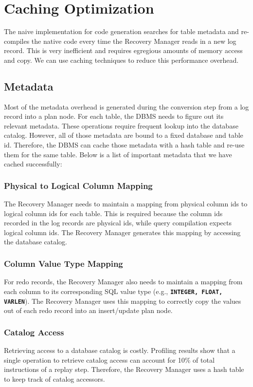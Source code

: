 \documentclass[12pt]{cmuthesis}
\newcommand{\dbSQL}[1]{\texttt{\textbf{#1}}\xspace}
\begin{document}
\section{Caching Optimization}

The naive implementation for code generation searches for table metadata and re-compiles the native code every time the Recovery Manager reads in a new log record. This is very inefficient and requires egregious amounts of memory access and copy. We can use caching techniques to reduce this performance overhead.

\subsection{Metadata}
Most of the metadata overhead is generated during the conversion step from a log record into a plan node. For each table, the DBMS needs to figure out its relevant metadata. These operations require frequent lookup into the database catalog. However, all of those metadata are bound to a fixed database and table id. Therefore, the DBMS can cache those metadata with a hash table and re-use them for the same table. Below is a list of important metadata that we have cached successfully:

\subsubsection{Physical to Logical Column Mapping}
The Recovery Manager needs to maintain a mapping from physical column ids to logical column ids for each table. This is required because the column ids recorded in the log records are physical ids, while query compilation expects logical column ids. The Recovery Manager generates this mapping by accessing the database catalog.
\subsubsection{Column Value Type Mapping}
For redo records, the Recovery Manager also needs to maintain a mapping from each column to its corresponding SQL value type (e.g., \dbSQL{INTEGER, FLOAT, VARLEN}). The Recovery Manager uses this mapping to correctly copy the values out of each redo record into an insert/update plan node.
\subsubsection{Catalog Access}
Retrieving access to a database catalog is costly. Profiling results show that a single operation to retrieve catalog access can account for 10\% of total instructions of a replay step. Therefore, the Recovery Manager uses a hash table to keep track of catalog accessors.
\end{document}
